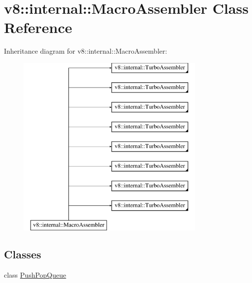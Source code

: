 \hypertarget{classv8_1_1internal_1_1MacroAssembler}{}\section{v8\+:\+:internal\+:\+:Macro\+Assembler Class Reference}
\label{classv8_1_1internal_1_1MacroAssembler}
Inheritance diagram for v8\+:\+:internal\+:\+:Macro\+Assembler\+:\begin{figure}[H]
\begin{center}
\leavevmode
\includegraphics[height=9.000000cm]{classv8_1_1internal_1_1MacroAssembler}
\end{center}
\end{figure}
\subsection*{Classes}
\begin{DoxyCompactItemize}
\item 
class \mbox{\hyperlink{classv8_1_1internal_1_1MacroAssembler_1_1PushPopQueue}{Push\+Pop\+Queue}}
\end{DoxyCompactItemize}
